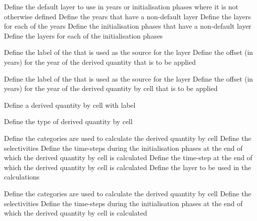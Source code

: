 \par\textbf{}\par
{} {Define the default layer to use in years or initialisation phases where it is not otherwise defined}
 {Define the years that have a non-default layer}
 {Define the layers for each of the years}
 {Define the initialisation phases that have a non-default layer}
 {Define the layers for each of the initialisation phases}
\par\textbf{}\par
{} {Define the label of the  that is used as the source for the layer}
 {Define the offset (in years) for the year of the derived quantity that is to be applied}
\par\textbf{}\par
{} {Define the label of the  that is used as the source for the layer}
 {Define the offset (in years) for the year of the derived quantity by cell that is to be applied}
\par{} {Define a derived quantity by cell with label}\par
{} {Define the type of derived quantity by cell}
\par\textbf{}\par
{} {Define the categories are used to calculate the derived quantity by cell}
 {Define the selectivities}
 {Define the time-steps during the initialisation phases at the end of which the derived quantity by cell is calculated}
 {Define the time-step at the end of which the derived quantity by cell is calculated}
 {Define the layer to be used in the calculations}
\par\textbf{}\par
{} {Define the categories are used to calculate the derived quantity by cell}
 {Define the selectivities}
 {Define the time-steps during the initialisation phases at the end of which the derived quantity by cell is calculated}
